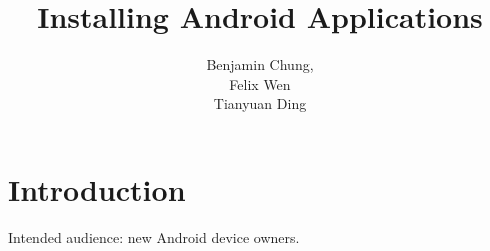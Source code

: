 \documentclass[10pt,a4paper,oneside]{article}
\author{Benjamin Chung,\\Felix Wen\\ Tianyuan Ding}
\title{Installing Android Applications}
\begin{document}
\maketitle

\section*{Introduction}
Intended audience: new Android device owners.\\
\end{document}
